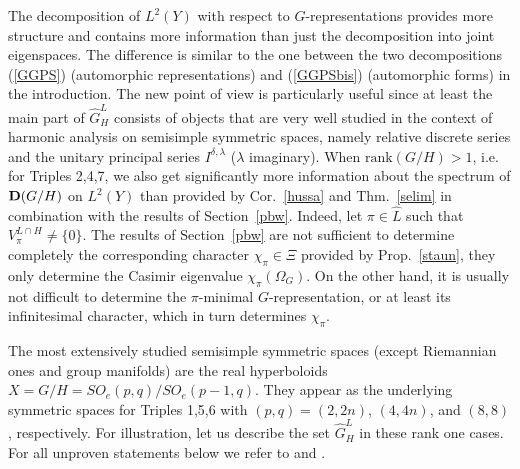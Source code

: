 \documentclass[10]{amsart}
\theoremstyle{remark}
\theoremstyle{definition}
\numberwithin{equation}{section}
\newcommand{\rank}{\text{rank}}
\begin{document}
{The decomposition of $L^2(Y)$ with respect to $G$-representations provides more structure and contains more information than just the decomposition into joint eigenspaces.
The difference is similar to the one between the two  decompositions (\ref{GGPS}) (automorphic representations) and (\ref{GGPSbis}) (automorphic forms) in the introduction.
The new point of view is particularly useful since at least the main part of $\widehat G_H^L$ consists of objects that are very well studied in the context of harmonic analysis on semisimple symmetric spaces, namely relative discrete series and the unitary principal series $I^{\delta,\lambda}$ ($\lambda$ imaginary). When $\rank(G/H)>1$, i.e. for Triples 2,4,7,
we also get significantly more information about the spectrum of ${\bf D}(G/H)$ on $L^2(Y)$ than provided by Cor.~\ref{hussa} and Thm.~\ref{selim} in combination with the results of Section~\ref{pbw}.
Indeed, let   
$\pi\in\widehat L$ such that $V_\pi^{L\cap H}\ne\{0\}$. The results of Section~\ref{pbw} are not sufficient to determine completely the corresponding character $\chi_\pi\in\Xi$ provided by Prop.~\ref{staun}, they only
determine the Casimir eigenvalue $\chi_\pi(\Omega_G)$. On the other hand, it is usually not difficult to determine the $\pi$-minimal $G$-representation, or at least its
infinitesimal character, which in turn determines $\chi_\pi$.

The most extensively studied semisimple symmetric spaces (except Riemannian ones and group manifolds) are the real hyperboloids $X=G/H=SO_e(p,q)/SO_e(p-1,q)$. They
appear as the underlying symmetric spaces for Triples 1,5,6 with $(p,q)=(2,2n)$, $(4,4n)$, and $(8,8)$, respectively. For illustration, let us describe the set $\widehat G_H^L$
in these rank one cases. For all unproven statements below we refer to \cite{HoTa93} and \cite{Sch87}. 

}
\end{document}
